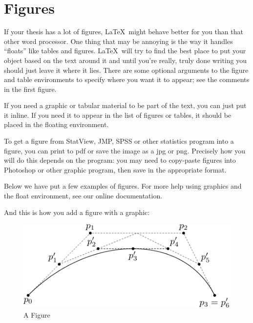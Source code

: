 \documentclass[12pt,twoside]{reedthesis}
\theoremstyle{plain}   %
\theoremstyle{definition}
\theoremstyle{remark}
\numberwithin{equation}{section}
\begin{document}
   
   \section{Figures}
   
	If your thesis has a lot of figures, \LaTeX\ might behave better for you than that other word processor.  One thing that may be annoying is the way it handles ``floats'' like tables and figures. \LaTeX\ will try to find the best place to put your object based on the text around it and until you're really, truly done writing you should just leave it where it lies.   There are some optional arguments to the figure and table environments to specify where you want it to appear; see the comments in the first figure.

	If you need a graphic or tabular material to be part of the text, you can just put it inline. If you need it to appear in the list of figures or tables, it should be placed in the floating environment. 
	
	To get a figure from StatView, JMP, SPSS or other statistics program into a figure, you can print to pdf or save the image as a jpg or png. Precisely how you will do this depends on the program: you may need to copy-paste figures into Photoshop or other graphic program, then save in the appropriate format.
	
	Below we have put a few examples of figures. For more help using graphics and the float environment, see our online documentation.
	
	And this is how you add a figure with a graphic:
	\begin{figure}[h]
	   
	       \centering
	    \includegraphics{subdivision}
	     \caption{A Figure}
	 \label{subd}
	\end{figure}
\end{document}
